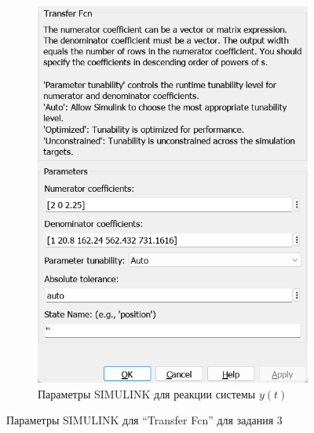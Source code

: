 \documentclass[a4paper, 12pt]{article}
\begin{document}
\begin{figure}[H]
\begin{subfigure}{0.3\textwidth}
            \includegraphics[width=\linewidth]{scheme3_window_tf.png}
            \caption{Параметры SIMULINK для реакции системы $y(t)$}
            \label{fig:yt}
        \end{subfigure}
        \caption{Параметры SIMULINK для ``Transfer Fcn'' для задания 3}
        \label{fig:windows3}
    \end{figure}
\end{document}
